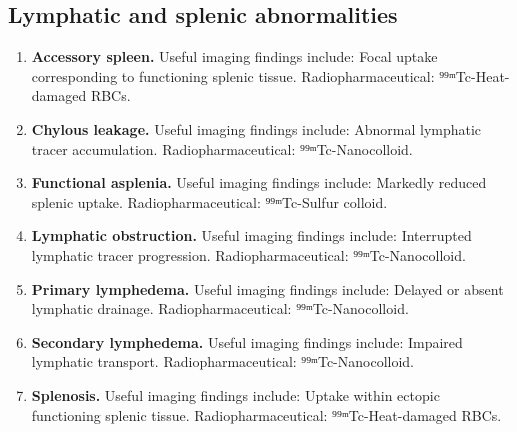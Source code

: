 \subsection{Lymphatic and splenic abnormalities}
\begin{enumerate}[leftmargin=*,itemsep=0.45em,topsep=0.4em]
\item \textbf{Accessory spleen.} Useful imaging findings include: Focal uptake corresponding to functioning splenic tissue. Radiopharmaceutical: ⁹⁹ᵐTc-Heat-damaged RBCs.
\item \textbf{Chylous leakage.} Useful imaging findings include: Abnormal lymphatic tracer accumulation. Radiopharmaceutical: ⁹⁹ᵐTc-Nanocolloid.
\item \textbf{Functional asplenia.} Useful imaging findings include: Markedly reduced splenic uptake. Radiopharmaceutical: ⁹⁹ᵐTc-Sulfur colloid.
\item \textbf{Lymphatic obstruction.} Useful imaging findings include: Interrupted lymphatic tracer progression. Radiopharmaceutical: ⁹⁹ᵐTc-Nanocolloid.
\item \textbf{Primary lymphedema.} Useful imaging findings include: Delayed or absent lymphatic drainage. Radiopharmaceutical: ⁹⁹ᵐTc-Nanocolloid.
\item \textbf{Secondary lymphedema.} Useful imaging findings include: Impaired lymphatic transport. Radiopharmaceutical: ⁹⁹ᵐTc-Nanocolloid.
\item \textbf{Splenosis.} Useful imaging findings include: Uptake within ectopic functioning splenic tissue. Radiopharmaceutical: ⁹⁹ᵐTc-Heat-damaged RBCs.
\end{enumerate}

